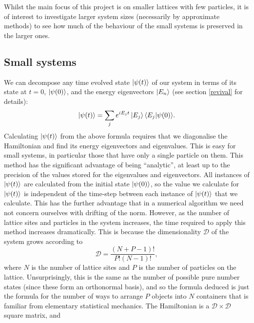 \documentclass[a4paper, 10pt]{article}
\theoremstyle{plain}
\begin{document}
Whilst the main focus of this project is on smaller lattices with few
particles, it is of interest to investigate larger system sizes (necessarily
by approximate methods) to see how much of the behaviour of the small systems
is preserved in the larger ones.


\subsection{Small systems}

We can decompose any time evolved state $\ket{\psi(t)}$ of our system in terms
of its state at $t=0$, $\ket{\psi(0)}$, and the energy eigenvectors $\ket{E_n}$
(see section \ref{revival} for details):
\begin{equation}
    \ket{\psi(t)} = \sum_{j}{e^{i E_{j}t} \ket{E_{j}} \braket{E_{j}|\psi(0)}}.
\end{equation}
Calculating $\ket{\psi(t)}$ from the above formula requires that we diagonalise
the Hamiltonian and find its energy eigenvectors and eigenvalues. This is easy
for small systems, in particular those that have only a single particle on them.
This method has the significant advantage of being ``analytic'', at least up to
the precision of the values stored for the eigenvalues and eigenvectors. All
instances of $\ket{\psi(t)}$ are calculated from the initial state
$\ket{\psi(0)}$, so the value we calculate for $\ket{\psi(t)}$ is independent of the time-step
between each instance of $\ket{\psi(t)}$ that we calculate. This has the further
advantage that in a numerical algorithm we need not concern ourselves with
drifting of the norm. However, as the number of lattice
sites and particles in the system increases, the time required to apply this
method increases dramatically. This is because the dimensionality $\mathcal{D}$
of the system grows according to
\begin{equation}
    \label{dimensionality_exact}
    \mathcal{D} = \frac{(N + P - 1)!}{P! (N-1)!},
\end{equation}
where $N$ is the number of lattice sites and $P$ is the number of particles on
the lattice. Unsurprisingly, this is the same as the number of possible pure
number states (since these form an orthonormal basis), and so the formula
deduced is just the formula for the number of ways to arrange $P$ objects into
$N$ containers that is familiar from elementary statistical mechanics.
The Hamiltonian is a $\mathcal{D}\times\mathcal{D}$ square matrix, and
\end{document}
